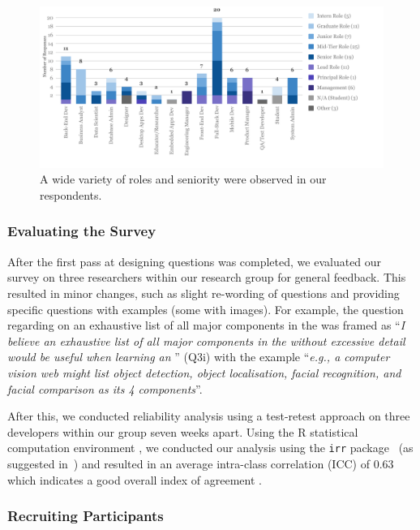 \begin{figure}[t]
\centering
\includegraphics[width=\linewidth]{roles-and-seniority.pdf}
\caption[Roles and seniority from survey participants]{A wide variety of roles and seniority were observed in our respondents.}
\label{tse2020:fig:roles-and-seniority}
\end{figure}

\subsubsection{Evaluating the Survey}
\label{tse2020:sec:validation:survey:eval}

After the first pass at designing questions was completed, we evaluated our survey on three researchers within our research group for general feedback. This resulted in minor changes, such as slight re-wording of questions and providing specific questions with examples (some with images). For example, the question regarding  on an exhaustive list of all major components in the  was framed as ``\textit{I believe an exhaustive list of all major components in the  without excessive detail would be useful when learning an }'' (Q3i) with the example ``\textit{e.g., a computer vision web  might list object detection, object localisation, facial recognition, and facial comparison as its 4 components}''.

After this, we conducted reliability analysis using a test-retest approach on three developers within our group seven weeks apart. Using the R statistical computation environment \citep{RCoreTeam}, we conducted our analysis using the \texttt{irr} package~\citep{Gamer:tj} (as suggested in~\citep{Hallgren:2012kt}) and  resulted in an average intra-class correlation (ICC) of 0.63 which indicates a good overall index of agreement \citep{cicchetti1994guidelines}.

\subsubsection{Recruiting Participants}

